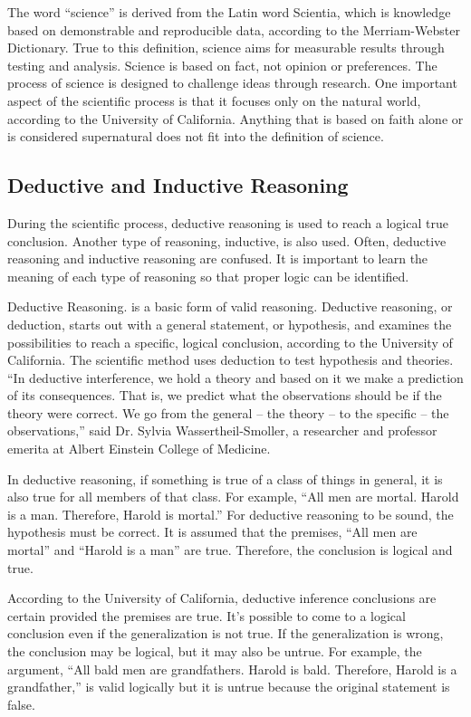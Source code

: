 The word ``science'' is derived from the Latin word Scientia, which is knowledge based on demonstrable and reproducible data, according to the Merriam-Webster Dictionary. True to this definition, science aims for measurable results through testing and analysis. Science is based on fact, not opinion or preferences. The process of science is designed to challenge ideas through research. One important aspect of the scientific process is that it focuses only on the natural world, according to the University of California. Anything that is based on faith alone or is considered supernatural does not fit into the definition of science.

\subsection{Deductive and Inductive Reasoning}

During the scientific process, deductive reasoning is used to reach a logical true conclusion. Another type of reasoning, inductive, is also used. Often, deductive reasoning and inductive reasoning are confused. It is important to learn the meaning of each type of reasoning so that proper logic can be identified.

Deductive Reasoning. is a basic form of valid reasoning. Deductive reasoning, or deduction, starts out with a general statement, or hypothesis, and examines the possibilities to reach a specific, logical conclusion, according to the University of California. The scientific method uses deduction to test hypothesis and theories. ``In deductive interference, we hold a theory and based on it we make a prediction of its consequences. That is, we predict what the observations should be if the theory were correct. We go from the general – the theory – to the specific – the observations,'' said Dr. Sylvia Wassertheil-Smoller, a researcher and professor emerita at Albert Einstein College of Medicine.

In deductive reasoning, if something is true of a class of things in general, it is also true for all members of that class. For example, ``All men are mortal. Harold is a man. Therefore, Harold is mortal.''  For deductive reasoning to be sound, the hypothesis must be correct. It is assumed that the premises, ``All men are mortal'' and ``Harold is a man'' are true. Therefore, the conclusion is logical and true.

According to the University of California, deductive inference conclusions are certain provided the premises are true. It’s possible to come to a logical conclusion even if the generalization is not true. If the generalization is wrong, the conclusion may be logical, but it may also be untrue. For example, the argument, ``All bald men are grandfathers. Harold is bald. Therefore, Harold is a grandfather,'' is valid logically but it is untrue because the original statement is false.

